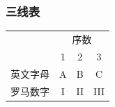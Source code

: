 \documentclass{ctexart}
\begin{document}
        \subsubsection{三线表}
            \begin{tabular}{cccc}
                \toprule
                &\multicolumn{3}{c}{序数}\\
                \cmidrule(l{.25em}r){1-2}\cmidrule[.25ex](lr){3-4}
                &1&2&3\\
                \midrule
                英文字母&A&B&C\\
                罗马数字&I&II&III\\
                \bottomrule
            \end{tabular}
\end{document}
